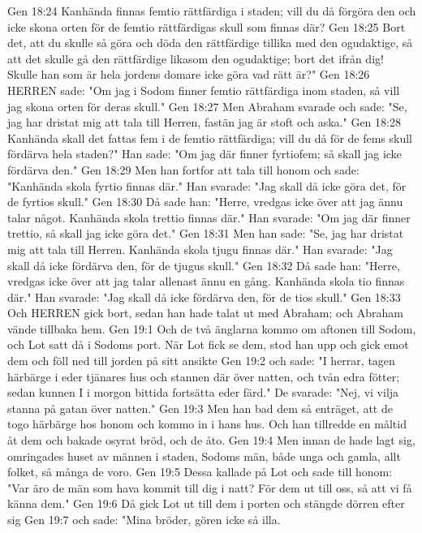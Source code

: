 Gen 18:24  Kanhända finnas femtio rättfärdiga i staden; vill du då förgöra den och icke skona orten för de femtio rättfärdigas skull som finnas där?
Gen 18:25  Bort det, att du skulle så göra och döda den rättfärdige tillika med den ogudaktige, så att det skulle gå den rättfärdige likasom den ogudaktige; bort det ifrån dig! Skulle han som är hela jordens domare icke göra vad rätt är?"
Gen 18:26  HERREN sade: "Om jag i Sodom finner femtio rättfärdiga inom staden, så vill jag skona orten för deras skull."
Gen 18:27  Men Abraham svarade och sade: "Se, jag har dristat mig att tala till Herren, fastän jag är stoft och aska."
Gen 18:28  Kanhända skall det fattas fem i de femtio rättfärdiga; vill du då för de fems skull fördärva hela staden?" Han sade: "Om jag där finner fyrtiofem; så skall jag icke fördärva den."
Gen 18:29  Men han fortfor att tala till honom och sade: "Kanhända skola fyrtio finnas där." Han svarade: "Jag skall då icke göra det, för de fyrtios skull."
Gen 18:30  Då sade han: "Herre, vredgas icke över att jag ännu talar något. Kanhända skola trettio finnas där." Han svarade: "Om jag där finner trettio, så skall jag icke göra det."
Gen 18:31  Men han sade: "Se, jag har dristat mig att tala till Herren. Kanhända skola tjugu finnas där." Han svarade: "Jag skall då icke fördärva den, för de tjugus skull."
Gen 18:32  Då sade han: "Herre, vredgas icke över att jag talar allenast ännu en gång. Kanhända skola tio finnas där." Han svarade: "Jag skall då icke fördärva den, för de tios skull."
Gen 18:33  Och HERREN gick bort, sedan han hade talat ut med Abraham; och Abraham vände tillbaka hem.
Gen 19:1  Och de två änglarna kommo om aftonen till Sodom, och Lot satt då i Sodoms port. När Lot fick se dem, stod han upp och gick emot dem och föll ned till jorden på sitt ansikte
Gen 19:2  och sade: "I herrar, tagen härbärge i eder tjänares hus och stannen där över natten, och tvån edra fötter; sedan kunnen I i morgon bittida fortsätta eder färd." De svarade: "Nej, vi vilja stanna på gatan över natten."
Gen 19:3  Men han bad dem så enträget, att de togo härbärge hos honom och kommo in i hans hus. Och han tillredde en måltid åt dem och bakade osyrat bröd, och de åto.
Gen 19:4  Men innan de hade lagt sig, omringades huset av männen i staden, Sodoms män, både unga och gamla, allt folket, så många de voro.
Gen 19:5  Dessa kallade på Lot och sade till honom: "Var äro de män som hava kommit till dig i natt? För dem ut till oss, så att vi få känna dem."
Gen 19:6  Då gick Lot ut till dem i porten och stängde dörren efter sig
Gen 19:7  och sade: "Mina bröder, gören icke så illa.
